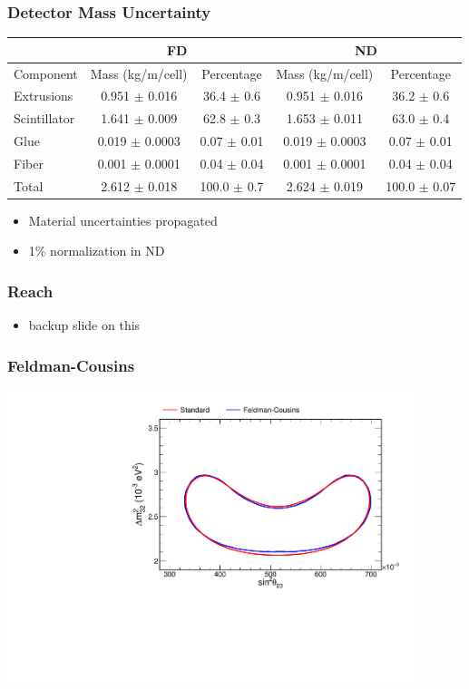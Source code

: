 \documentclass[10pt,professionalfonts,xcolor=table]{beamer}
\begin{document}
\begin{frame}
\frametitle{Detector Mass Uncertainty}
\begin{center}
\small
\begin{tabular}{|l|c|c|c|c|}
\hline
& \multicolumn{2}{c|}{FD} & \multicolumn{2}{c|}{ND} \\ \hline
Component    & Mass (kg/m/cell)   & Percentage & Mass (kg/m/cell) & Percentage \\ \hline
Extrusions   & 0.951 $\pm$ 0.016  & 36.4 $\pm$ 0.6  &  0.951 $\pm$ 0.016  & 36.2 $\pm$ 0.6 \\
Scintillator & 1.641 $\pm$ 0.009  & 62.8 $\pm$ 0.3  &  1.653 $\pm$ 0.011  & 63.0 $\pm$ 0.4 \\
Glue         & 0.019 $\pm$ 0.0003 & 0.07 $\pm$ 0.01 &  0.019 $\pm$ 0.0003 & 0.07 $\pm$ 0.01 \\
Fiber        & 0.001 $\pm$ 0.0001 & 0.04 $\pm$ 0.04 &  0.001 $\pm$ 0.0001 & 0.04 $\pm$ 0.04 \\ \hline
Total        & 2.612 $\pm$ 0.018  & 100.0 $\pm$ 0.7 &  2.624 $\pm$ 0.019  & 100.0 $\pm$ 0.07 \\ \hline
\end{tabular}
\end{center}

\begin{itemize}
\item Material uncertainties propagated
\item 1\% normalization in ND
\end{itemize}
\end{frame}


\begin{frame}
\frametitle{\nova Reach}

\begin{itemize}
\item backup slide on this
\end{itemize}
\end{frame}

\begin{frame}
\frametitle{Feldman-Cousins}
\centering
\includegraphics[angle=-90, width=0.9\textwidth]{figures/results/fc_compare.pdf}
\end{frame}
\end{document}
